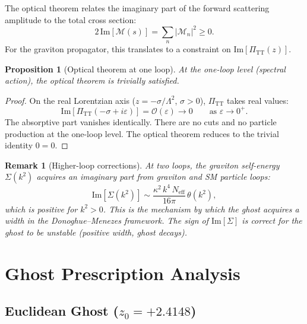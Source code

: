 \documentclass[11pt,a4paper]{article}
\newcommand{\PiTT}{\Pi_{\mathrm{TT}}}
\newcommand{\order}{\mathcal{O}}
\newcommand{\Neff}{N_{\mathrm{eff}}}
\newtheorem{proposition}[theorem]{Proposition}
\newtheorem{remark}[theorem]{Remark}
\begin{document}
The optical theorem relates the imaginary part of the forward scattering
amplitude to the total cross section:
\begin{equation}\label{eq:optical}
  2\,\mathrm{Im}[\mathcal{M}(s)] = \sum_n |\mathcal{M}_n|^2 \geq 0.
\end{equation}
For the graviton propagator, this translates to a constraint on
$\mathrm{Im}[\PiTT(z)]$.

\begin{proposition}[Optical theorem at one loop]
\label{prop:optical}
At the one-loop level (spectral action), the optical theorem is
trivially satisfied.
\end{proposition}

\begin{proof}
On the real Lorentzian axis ($z = -\sigma/\Lambda^2$, $\sigma > 0$),
$\PiTT$ takes real values:
\begin{equation}
  \mathrm{Im}[\PiTT(-\sigma + i\varepsilon)]
  = \order(\varepsilon) \to 0
  \qquad \text{as } \varepsilon \to 0^+.
\end{equation}
The absorptive part vanishes identically.  There are no cuts and no
particle production at the one-loop level.  The optical theorem reduces
to the trivial identity $0 = 0$.
\end{proof}

\begin{remark}[Higher-loop corrections]
At two loops, the graviton self-energy $\Sigma(k^2)$ acquires an
imaginary part from graviton and SM particle loops:
\begin{equation}
  \mathrm{Im}[\Sigma(k^2)]
  \sim \frac{\kappa^2\,k^4\,\Neff}{16\pi}\,\theta(k^2),
\end{equation}
which is positive for $k^2 > 0$.  This is the mechanism by which the
ghost acquires a width in the Donoghue--Menezes framework.  The sign of
$\mathrm{Im}[\Sigma]$ is correct for the ghost to be unstable (positive
width, ghost decays).
\end{remark}


\section{Ghost Prescription Analysis}
\label{sec:prescriptions}

\subsection{Euclidean Ghost ($z_0 = +2.4148$)}
\label{sec:euclidean-ghost}
\end{document}
